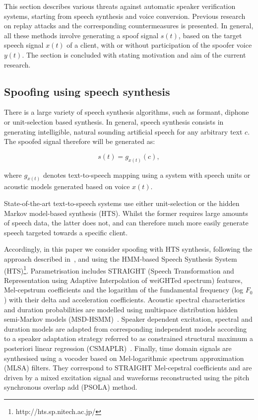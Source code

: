 This section describes various threats against automatic speaker verification systems, starting from speech synthesis and voice conversion. Previous research on replay attacks and the corresponding countermeasures is presented. In general, all these methods involve generating a spoof signal $s(t)$, based on the target speech signal $x(t)$ of a client, with or without participation of the spoofer voice $y(t)$. The section is concluded with stating motivation and aim of the current research. 

\subsection{Spoofing using speech synthesis}

There is a large variety of speech synthesis algorithms, such as formant, diphone or unit-selection based synthesis. In general, speech synthesis consists in generating intelligible, natural sounding artificial speech for any arbitrary text $c$. The spoofed signal therefore will be generated as:

\begin{equation}
s(t) = g_{x(t)}(c),
\label{eq:tts}
\end{equation}

\noindent where $g_{x(t)}$ denotes text-to-speech mapping using a system with speech units or acoustic models generated based on voice $x(t)$.

State-of-the-art text-to-speech systems use either unit-selection or the hidden Markov model-based synthesis (HTS). Whilst the former requires large amounts of speech data, the latter does not, and can therefore much more easily generate speech targeted towards a specific client. 

Accordingly, in this paper we consider spoofing with HTS synthesis, following the approach described in~\cite{Yamagishi2009}, and using the HMM-based Speech Synthesis System (HTS)\footnote{http://hts.sp.nitech.ac.jp/}. Parametrisation includes STRAIGHT (Speech Transformation and Representation using Adaptive Interpolation of weiGHTed spectrum) features, Mel-cepstrum coefficients and the logarithm of the fundamental frequency (log $F_{0}$) with their delta and acceleration coefficients. Acoustic spectral characteristics and duration probabilities are modelled using multispace distribution hidden semi-Markov models (MSD-HSMM)~\cite{Russell1985}.  Speaker dependent  excitation, spectral and duration models are adapted from corresponding independent models according to a speaker adaptation strategy referred to as constrained structural maximum a posteriori linear regression (CSMAPLR)~\cite{Yamagishi2009a}.  Finally, time domain signals are synthesised using a vocoder based on Mel-logarithmic spectrum approximation (MLSA) filters.  They correspond to STRAIGHT Mel-cepstral coefficients and are driven by a mixed excitation signal and waveforms reconstructed using the pitch synchronous overlap add (PSOLA) method.



